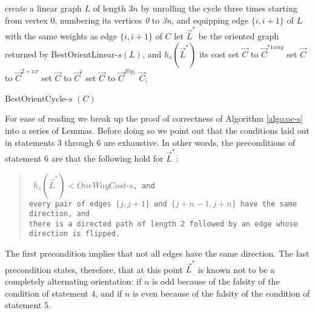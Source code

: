 \begin{algorithm}
	create a linear graph $L$ of 
	length $3n$ by unrolling the cycle three times starting from vertex $0$,
	numbering its vertices \textit{0} to \textit{3n}, and
	equipping edge $\{i,i+1\}$ of $L$ with the same weights as edge 
	$\{i ,i+1\}$ of $C$\;
	let $\vec{L}^*$ be the oriented graph returned by BestOrientLinear-$s(L)$, and $h_s(\vec{L}^*)$ its cost\;
	{set $\vec{C}$ to $\vec{C}^{*1way}$}
	{
	{set $\vec{C}$ to $\vec{C}^{2+xx}$}
	}
	{set $\vec{C}$ to $\vec{C}^{i}$
	}
	\lElse
	{set $\vec{C}$ to $\vec{C}^{flip_i}$}
	\Return $\vec{C}$;
	\caption{BestOrientCycle-$s$ $(C)$}
	\label{algo:oc-s}
\end{algorithm}

\newpage For ease of reading we break up the proof of correctness of Algorithm \ref{algo:oc-s} into a series of Lemmas. Before doing so we point out that the conditions laid out in 
statements 3 through 6 are exhaustive. In other words, the preconditions of statement 6 are 
that the following hold for $\vec{L}^*$:
\begin{verse}
\texttt{
$h_s(\vec{L}^*) < \textit{OneWayCost-s}$, and \\
every pair of edges $\{j,j+1\}$ and $\{j+n-1,j+n\}$ have the same direction, and \\
there is a directed path of length 2 followed by an edge whose direction is flipped.}
\end{verse}
The first precondition implies that not all edges have the same direction. The last 
precondition states, therefore, that at this point $\vec{L}^*$ is known not to be a completely alternating
orientation: if $n$ is odd because of the falsity of the condition of statement 4, and 
if $n$ is even because of the falsity of the condition of statement 5.

